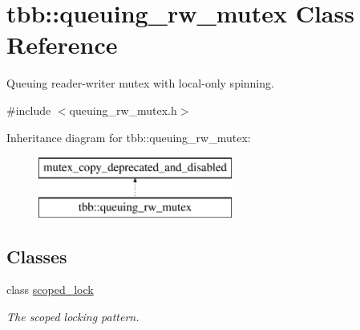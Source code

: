 \hypertarget{classtbb_1_1queuing__rw__mutex}{}\section{tbb\+:\+:queuing\+\_\+rw\+\_\+mutex Class Reference}
\label{classtbb_1_1queuing__rw__mutex}


Queuing reader-\/writer mutex with local-\/only spinning.  




{\ttfamily \#include $<$queuing\+\_\+rw\+\_\+mutex.\+h$>$}

Inheritance diagram for tbb\+:\+:queuing\+\_\+rw\+\_\+mutex\+:\begin{figure}[H]
\begin{center}
\leavevmode
\includegraphics[height=2.000000cm]{classtbb_1_1queuing__rw__mutex}
\end{center}
\end{figure}
\subsection*{Classes}
\begin{DoxyCompactItemize}
\item 
class \hyperlink{classtbb_1_1queuing__rw__mutex_1_1scoped__lock}{scoped\+\_\+lock}
\begin{DoxyCompactList}\small\item\em The scoped locking pattern. \end{DoxyCompactList}\end{DoxyCompactItemize}
